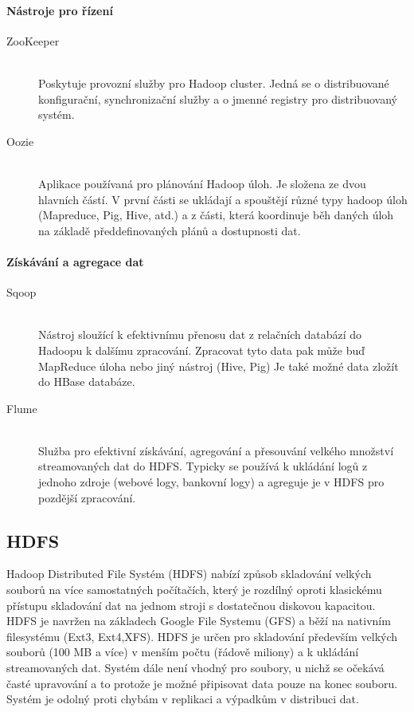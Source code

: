 \documentclass[thesis=M,czech]{FITthesis}[2012/06/26]
\begin{document}
\paragraph{Nástroje pro řízení}
\begin{description}
\item[ZooKeeper] \hfill \\
Poskytuje provozní služby pro Hadoop cluster. Jedná se o distribuované konfigurační, synchronizační služby a o jmenné registry pro distribuovaný systém. 

\item[Oozie] \hfill \\
Aplikace používaná pro plánování Hadoop úloh. Je složena ze dvou hlavních částí. V první části se ukládají a spouštějí různé typy hadoop úloh (Mapreduce, Pig, Hive, atd.) a z části, která koordinuje běh daných úloh na základě předdefinovaných plánů a dostupnosti dat.
\end{description}

\paragraph{Získávání a agregace dat}
\begin{description}
\item[Sqoop] \hfill \\
Nástroj sloužící k efektivnímu přenosu dat z relačních databází do Hadoopu k dalšímu zpracování. Zpracovat tyto data pak může buď MapReduce úloha nebo jiný nástroj (Hive, Pig) Je také možné data zložít do HBase databáze.
\item[Flume] \hfill \\
Služba pro efektivní získávání, agregování a přesouvání velkého množství streamovaných dat do HDFS. Typicky se používá k ukládání logů z jednoho zdroje (webové logy, bankovní logy) a agreguje je v HDFS pro pozdější zpracování.
\end{description}

\subsection{HDFS}
Hadoop Distributed File Systém (HDFS) nabízí způsob skladování velkých souborů na více samostatných počítačích, který je rozdílný oproti klasickému přístupu skladování dat na jednom stroji s dostatečnou diskovou kapacitou. HDFS je navržen na základech Google File Systemu (GFS) a běží na nativním filesystému (Ext3, Ext4,XFS). HDFS je určen pro skladování především velkých souborů (100 MB a více) v menším počtu (řádově miliony) a k ukládání streamovaných dat. Systém dále není vhodný pro soubory, u nichž se očekává časté upravování a to protože je možné připisovat data pouze na konec souboru. Systém je odolný proti chybám v replikaci a výpadkům v distribuci dat.\cite{HDFSWEB}
\end{document}
